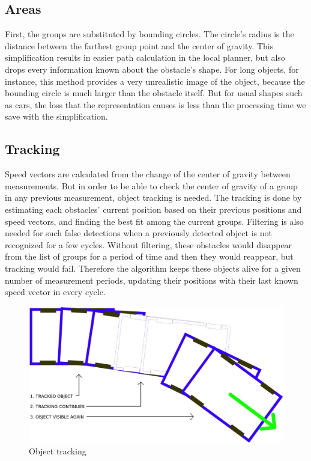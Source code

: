 \subsection{Areas}
First, the groups are substituted by bounding circles. The circle's radius is the distance between the farthest group point and the center of gravity. This simplification results in easier path calculation in the local planner, but also drops every information known about the obstacle's shape. For long objects, for instance, this method provides a very unrealistic image of the object, because the bounding circle is much larger than the obstacle itself. But for usual shapes such as cars, the loss that the representation causes is less than the processing time we save with the simplification.

\subsection{Tracking}
\label{chap:tracking}
Speed vectors are calculated from the change of the center of gravity between measurements. But in order to be able to check the center of gravity of a group in any previous measurement, object tracking is needed. The tracking is done by estimating each obstacles' current position based on their previous positions and speed vectors, and finding the best fit among the current groups. Filtering is also needed for such false detections when a previously detected object is not recognized for a few cycles. Without filtering, these obstacles would disappear from the list of groups for a period of time and then they would reappear, but tracking would fail. Therefore the algorithm keeps these objects alive for a given number of measurement periods, updating their positions with their last known speed vector in every cycle.

\begin{figure}[!ht]
    \centering
    \includegraphics[width=\textwidth]{figures/raw/jpeg/tracking.jpg}
    \caption{Object tracking}
    \label{tracking}
\end{figure}

